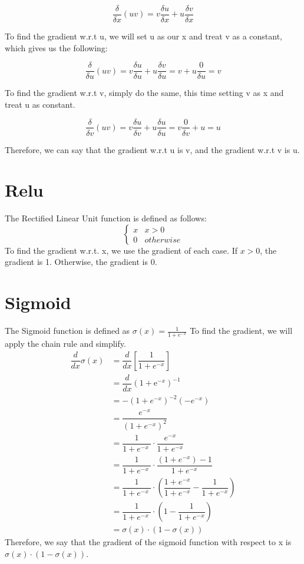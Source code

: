 \documentclass{article}
\begin{document}
        $$\frac{\delta}{\delta{x}}(uv) = v\frac{\delta{u}}{\delta{x}} + u\frac{\delta{v}}{\delta{x}}$$

        To find the gradient w.r.t u, we will set u as our x and treat v as a constant, 
        which gives us the following:

        $$\frac{\delta}{\delta{u}}(uv) = v\frac{\delta{u}}{\delta{u}} + u\frac{\delta{v}}{\delta{u}} = v + u\frac{0}{\delta{u}} = v$$

        To find the gradient w.r.t v, simply do the same, this time setting v as x and treat u as constant.

        $$\frac{\delta}{\delta{v}}(uv) = v\frac{\delta{u}}{\delta{v}} + u\frac{\delta{u}}{\delta{u}} = v\frac{0}{\delta{v}} + u = u$$

        Therefore, we can say that the gradient w.r.t u is v, and the gradient w.r.t v is u. 

\noindent\makebox[\linewidth]{\rule{\paperwidth}{0.4pt}}
    \section{Relu}
        The Rectified Linear Unit function is defined as follows:
        \[ \begin{cases} 
            x & x > 0 \\
            0 & otherwise
        \end{cases}
        \]
        To find the gradient w.r.t. x, we use the gradient of each case. If $x > 0$, the gradient is 1. Otherwise, the gradient is 0.

\noindent\makebox[\linewidth]{\rule{\paperwidth}{0.4pt}}
    \section{Sigmoid}
        The Sigmoid function is defined as $\sigma(x) = \frac{1}{1+e^{-x}}$ To find the gradient, we will apply the chain rule and simplify.
        \begin{align}
            \dfrac{d}{dx} \sigma(x) &= \dfrac{d}{dx} \left[ \dfrac{1}{1 + e^{-x}} \right]\\
            &= \dfrac{d}{dx} \left( 1 + \mathrm{e}^{-x} \right)^{-1} \\
            &= -(1 + e^{-x})^{-2}(-e^{-x}) \\
            &= \dfrac{e^{-x}}{\left(1 + e^{-x}\right)^2} \\
            &= \dfrac{1}{1 + e^{-x}\ } \cdot \dfrac{e^{-x}}{1 + e^{-x}}  \\
            &= \dfrac{1}{1 + e^{-x}\ } \cdot \dfrac{(1 + e^{-x}) - 1}{1 + e^{-x}}  \\
            &= \dfrac{1}{1 + e^{-x}\ } \cdot \left( \dfrac{1 + e^{-x}}{1 + e^{-x}} - \dfrac{1}{1 + e^{-x}} \right) \\
            &= \dfrac{1}{1 + e^{-x}\ } \cdot \left( 1 - \dfrac{1}{1 + e^{-x}} \right) \\
            &= \sigma(x) \cdot (1 - \sigma(x))
        \end{align}
    Therefore, we say that the gradient of the sigmoid function with respect to x is $\sigma(x) \cdot (1-\sigma(x))$.
\end{document}
